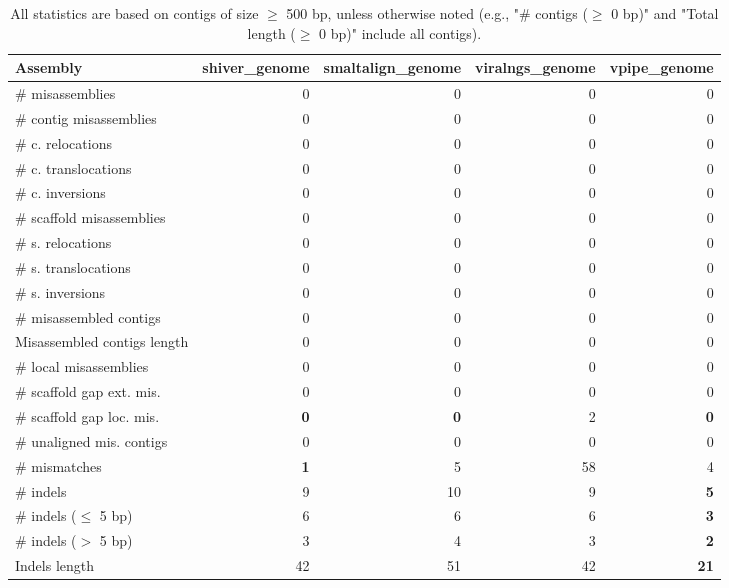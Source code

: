 \documentclass[12pt,a4paper]{article}
\begin{document}
\begin{table}[ht]
\begin{center}
\caption{All statistics are based on contigs of size $\geq$ 500 bp, unless otherwise noted (e.g., "\# contigs ($\geq$ 0 bp)" and "Total length ($\geq$ 0 bp)" include all contigs).}
\begin{tabular}{|l*{4}{|r}|}
\hline
Assembly & shiver\_genome & smaltalign\_genome & viralngs\_genome & vpipe\_genome \\ \hline
\# misassemblies & 0 & 0 & 0 & 0 \\ \hline
\hspace{2mm}\# contig misassemblies & 0 & 0 & 0 & 0 \\ \hline
\hspace{5mm}\# c. relocations & 0 & 0 & 0 & 0 \\ \hline
\hspace{5mm}\# c. translocations & 0 & 0 & 0 & 0 \\ \hline
\hspace{5mm}\# c. inversions & 0 & 0 & 0 & 0 \\ \hline
\hspace{2mm}\# scaffold misassemblies & 0 & 0 & 0 & 0 \\ \hline
\hspace{5mm}\# s. relocations & 0 & 0 & 0 & 0 \\ \hline
\hspace{5mm}\# s. translocations & 0 & 0 & 0 & 0 \\ \hline
\hspace{5mm}\# s. inversions & 0 & 0 & 0 & 0 \\ \hline
\# misassembled contigs & 0 & 0 & 0 & 0 \\ \hline
Misassembled contigs length & 0 & 0 & 0 & 0 \\ \hline
\# local misassemblies & 0 & 0 & 0 & 0 \\ \hline
\# scaffold gap ext. mis. & 0 & 0 & 0 & 0 \\ \hline
\# scaffold gap loc. mis. & {\bf 0} & {\bf 0} & 2 & {\bf 0} \\ \hline
\# unaligned mis. contigs & 0 & 0 & 0 & 0 \\ \hline
\# mismatches & {\bf 1} & 5 & 58 & 4 \\ \hline
\# indels & 9 & 10 & 9 & {\bf 5} \\ \hline
\hspace{5mm}\# indels ($\leq$ 5 bp) & 6 & 6 & 6 & {\bf 3} \\ \hline
\hspace{5mm}\# indels ($>$ 5 bp) & 3 & 4 & 3 & {\bf 2} \\ \hline
Indels length & 42 & 51 & 42 & {\bf 21} \\ \hline
\end{tabular}
\end{center}
\end{table}
\end{document}
